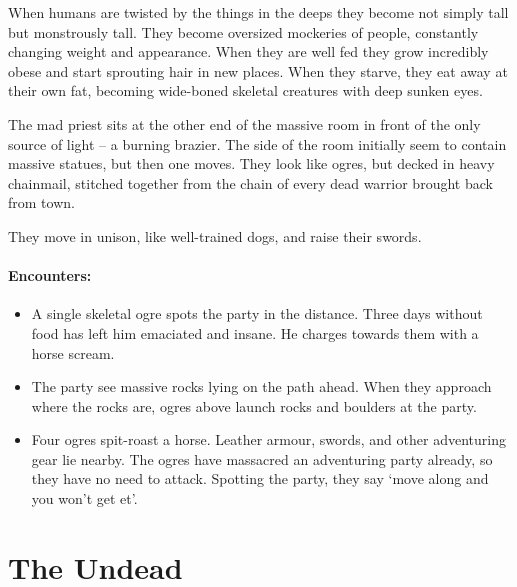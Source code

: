 \begin{multicols}{2}
When humans are twisted by the things in the deeps they become not simply tall but monstrously tall.
They become oversized mockeries of people, constantly changing weight and appearance.
When they are well fed they grow incredibly obese and start sprouting hair in new places.
When they starve, they eat away at their own fat, becoming wide-boned skeletal creatures with deep sunken eyes.


\begin{boxtext}

  The mad priest sits at the other end of the massive room in front of the only source of light -- a burning brazier.
  The side of the room initially seem to contain massive statues, but then one moves.
  They look like ogres, but decked in heavy chainmail, stitched together from the chain of every dead warrior brought back from town.

  They move in unison, like well-trained dogs, and raise their swords.

\end{boxtext}

\paragraph{Encounters:}

\begin{itemize}

  \item
  A single skeletal ogre spots the party in the distance.
  Three days without food has left him emaciated and insane.
  He charges towards them with a horse scream.
  \item
  The party see massive rocks lying on the path ahead.
  When they approach where the rocks are, ogres above launch rocks and boulders at the party.
  \item
  Four ogres spit-roast a horse.
  Leather armour, swords, and other adventuring gear lie nearby.
  The ogres have massacred an adventuring party already, so they have no need to attack.
  Spotting the party, they say `move along and you won't get et'.

\end{itemize}

\end{multicols}

\section{The Undead}

